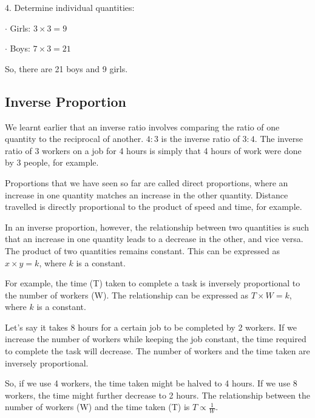 \documentclass{article}
\begin{document}
\begin{spacing}{1.25}
\begin{enumerate}
4. Determine individual quantities:

$\cdot$ Girls: $3 \times 3 = 9$

$\cdot$ Boys: $7 \times 3 = 21$

So, there are 21 boys and 9 girls.

\subsection*{Inverse Proportion}

We learnt earlier that an inverse ratio involves comparing the ratio of one quantity to the reciprocal of another. $4 : 3$ is the inverse ratio of $3 : 4$. The inverse ratio of 3 workers on a job for 4 hours is simply that 4 hours of work were done by 3 people, for example.

Proportions that we have seen so far are called direct proportions, where an increase in one quantity matches an increase in the other quantity. Distance travelled is directly proportional to the product of speed and time, for example.

In an inverse proportion, however, the relationship between two quantities is such that an increase in one quantity leads to a decrease in the other, and vice versa. The product of two quantities remains constant. This can be expressed as $x\times y=k$, where $k$ is a constant.

For example, the time (T) taken to complete a task is inversely proportional to the number of workers (W). The relationship can be expressed as $T\times W=k$, where $k$ is a constant.

Let's say it takes 8 hours for a certain job to be completed by 2 workers. If we increase the number of workers while keeping the job constant, the time required to complete the task will decrease. The number of workers and the time taken are inversely proportional.

So, if we use 4 workers, the time taken might be halved to 4 hours. If we use 8 workers, the time might further decrease to 2 hours. The relationship between the number of workers (W) and the time taken (T) is $T\propto\frac{1}{W}$.


\end{enumerate}
\end{spacing}
\end{document}
